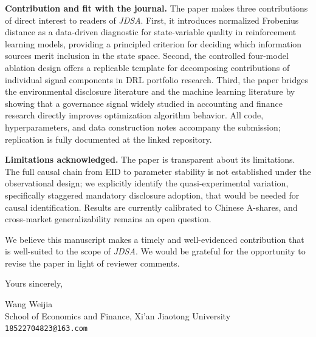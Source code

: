 \documentclass[12pt]{article}
\begin{document}
\textbf{Contribution and fit with the journal.}
The paper makes three contributions of direct interest to readers of
\textit{JDSA}. First, it introduces normalized Frobenius distance as a
data-driven diagnostic for state-variable quality in reinforcement
learning models, providing a principled criterion for deciding which
information sources merit inclusion in the state space. Second, the
controlled four-model ablation design offers a replicable template for
decomposing contributions of individual signal components in DRL
portfolio research. Third, the paper bridges the environmental
disclosure literature and the machine learning literature by showing
that a governance signal widely studied in accounting and finance
research directly improves optimization algorithm behavior. All code,
hyperparameters, and data construction notes accompany the submission;
replication is fully documented at the linked repository.

\textbf{Limitations acknowledged.}
The paper is transparent about its limitations. The full causal chain
from EID to parameter stability is not established under the
observational design; we explicitly identify the quasi-experimental
variation, specifically staggered mandatory disclosure adoption, that
would be needed for causal identification. Results are currently
calibrated to Chinese A-shares, and cross-market generalizability
remains an open question.

We believe this manuscript makes a timely and well-evidenced
contribution that is well-suited to the scope of
\textit{JDSA}. We would be grateful for the opportunity to revise the
paper in light of reviewer comments.

\bigskip

Yours sincerely,

\vspace{1.5cm}

Wang Weijia\\
School of Economics and Finance, Xi'an Jiaotong University\\
\texttt{18522704823@163.com}
\end{document}
